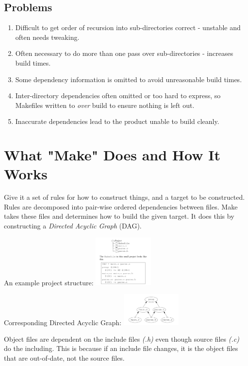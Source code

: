 \subsection{Problems}
\begin{enumerate}
\item Difficult to get order of recursion into sub-directories correct - unstable and 
often needs tweaking.
\item Often necessary to do more than one pass over sub-directories - increases build times.
\item Some dependency information is omitted to avoid unreasonable build times.
\item Inter-directory dependencies often omitted or too hard to express, so Makefiles written to 
\textit{over} build to ensure nothing is left out.
\item Inaccurate dependencies lead to the product unable to build cleanly.
\end{enumerate}

\section{What "Make" Does and How It Works}

Give it a set of rules for how to construct things, and a target to be constructed. Rules 
are decomposed into pair-wise ordered dependencies between files. Make takes these files 
and determines how to build the given target. It does this by constructing a
\textit{Directed Acyclic Graph} (DAG).

An example project structure:
\includegraphics[width=3cm]{simpleproject}

Corresponding Directed Acyclic Graph:
\includegraphics[width=3cm]{dag}

Object files are dependent on the include files \textit{(.h)} even though source files \textit{(.c)} do the including.
This is because if an include file changes, it is the object files that are out-of-date, not the 
source files.

